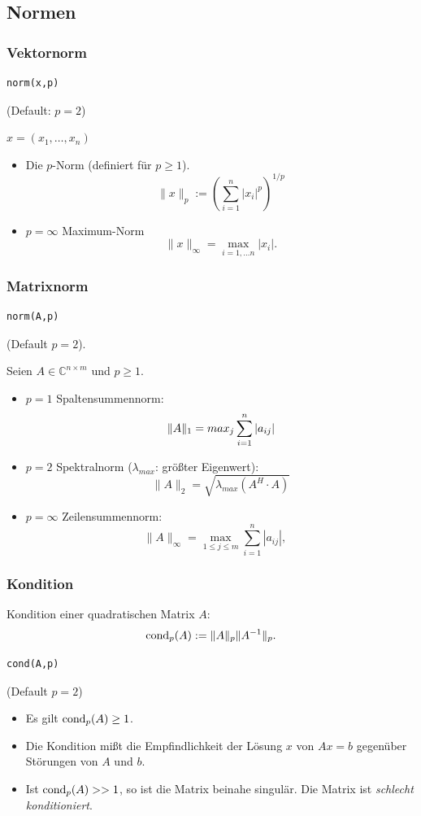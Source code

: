 \documentclass[hyperref={xetex}]{beamer}
\begin{document}
\subsection{Normen}
% 
%
\begin{frame}[fragile]\frametitle{Vektornorm}
\begin{lstlisting}
norm(x,p) 
\end{lstlisting}
(Default: $p=2$) 

$x=(x_1, {} \dots , x_n)$
\begin{itemize}
\item Die $p$-Norm (definiert für $p\geq 1$).
\[ \|x \|_p := \left( \sum_{i=1}^n  |x_i|^p \right)^{1/p} \] 
\item $p=\infty$  Maximum-Norm 
\[  \|x \|_\infty = \max_{i=1, \dots n} |x_i|. \]
\end{itemize}
\end{frame}
% 
%
\begin{frame}[fragile]\frametitle{Matrixnorm}
\begin{lstlisting}
norm(A,p) 
\end{lstlisting}
(Default $p=2$).

Seien  $A\in \mathbb{C}^{n \times m}$ und $p \geq 1$. 
\begin{itemize}
\item $p=1$ Spaltensummennorm:
\[ 
\| A \|_1 = max_j \sum_{i=1}^n \left\lvert a_{ij}\right\rvert
\]
\item $p=2$ Spektralnorm ($\lambda_{max}$: größter Eigenwert):
\[
\| A \|_2 = \sqrt{\lambda_{max} (A^H \cdot A)}
\]
\item $p=\infty$ Zeilensummennorm:
\[ 
\|A\|_\infty = \max_{1 \leq j \leq m} \sum_{i=1}^n |a_{ij}|, \quad
\]
\end{itemize} 
\end{frame}
% 
%
\begin{frame}[fragile]\frametitle{Kondition}
Kondition einer quadratischen Matrix $A$: 
{ \[ \operatorname{cond}_p(A):=\|A\|_p\|A^{-1}\|_p. \] }
\vspace*{-0.8cm}
\begin{lstlisting}
cond(A,p)
\end{lstlisting}
(Default $p=2$)
\begin{itemize}
\item Es gilt $\operatorname{cond}_p(A)\geq 1$.
\item Die Kondition mißt die Empfindlichkeit der Lösung $x$ von $Ax=b$
  gegenüber  Störungen
  von $A$ und $b$.
\item Ist $\operatorname{cond}_p(A) >> 1$, so ist die Matrix beinahe singulär. Die Matrix ist {\it schlecht konditioniert}.
\end{itemize}
\end{frame}
\end{document}
